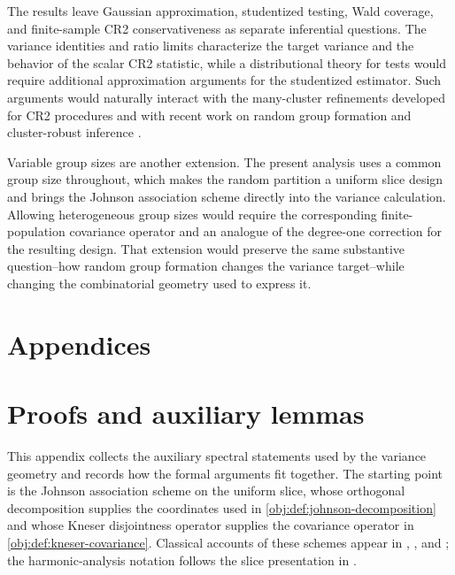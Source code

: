 \documentclass[11pt]{article}
\begin{document}
The results leave Gaussian approximation, studentized testing, Wald coverage, and finite-sample CR2 conservativeness as separate inferential questions. The variance identities and ratio limits characterize the target variance and the behavior of the scalar CR2 statistic, while a distributional theory for tests would require additional approximation arguments for the studentized estimator. Such arguments would naturally interact with the many-cluster refinements developed for CR2 procedures \citep{PustejovskyTipton2018} and with recent work on random group formation and cluster-robust inference \citep{FuSamiiWang2026}.

Variable group sizes are another extension. The present analysis uses a common group size throughout, which makes the random partition a uniform slice design and brings the Johnson association scheme directly into the variance calculation. Allowing heterogeneous group sizes would require the corresponding finite-population covariance operator and an analogue of the degree-one correction for the resulting design. That extension would preserve the same substantive question--how random group formation changes the variance target--while changing the combinatorial geometry used to express it.


\appendix

\section*{Appendices}

\section{Proofs and auxiliary lemmas}\label{sec:appendix}

This appendix collects the auxiliary spectral statements used by the variance geometry and records how the formal arguments fit together. The starting point is the Johnson association scheme on the uniform slice, whose orthogonal decomposition supplies the coordinates used in \cref{obj:def:johnson-decomposition} and whose Kneser disjointness operator supplies the covariance operator in \cref{obj:def:kneser-covariance}. Classical accounts of these schemes appear in \citet{Delsarte1973}, \citet{BrouwerCohenNeumaier1989}, and \citet{BrouwerEtAl2018}; the harmonic-analysis notation follows the slice presentation in \citet{Filmus2016}.
\end{document}
